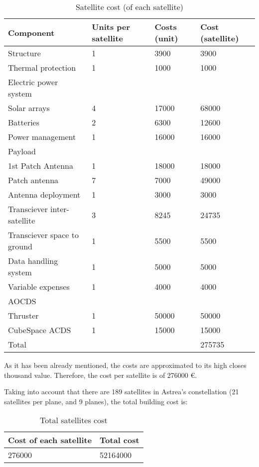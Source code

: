 \begin{table}[h]
\begin{center}
\begin{tabular}{ | l | l | l | l | }
\toprule
\hline
\rowcolor[gray]{0.75}
	Component & Units per satellite & Costs (unit) & Cost (satellite) \\ \hline
	Structure & 1 & 3900 & 3900 \\ \hline
	Thermal protection & 1 & 1000 & 1000 \\ \hline
	\rowcolor[gray]{0.85}
	Electric power system &  & \  & \  \\ \hline
	Solar arrays & 4 & 17000 & 68000 \\ \hline
	Batteries & 2 & 6300 & 12600 \\ \hline
	Power management & 1 & 16000 & 16000 \\ \hline
	\rowcolor[gray]{0.85}
	Payload &  & \  & \  \\ \hline
	1st Patch Antenna & 1 & 18000 & 18000 \\ \hline
	Patch antenna & 7 & 7000 & 49000 \\ \hline
	Antenna deployment & 1 & 3000 & 3000 \\ \hline
	Transciever inter-satellite & 3 & 8245 & 24735 \\ \hline
	Transciever space to ground & 1 & 5500 & 5500 \\ \hline
	Data handling system & 1 & 5000 & 5000 \\ \hline
	Variable expenses & 1 & 4000 & 4000 \\ \hline
	\rowcolor[gray]{0.85}
	AOCDS &  & \  & \  \\ \hline
	Thruster & 1 & 50000 & 50000 \\ \hline
	CubeSpace ACDS & 1 & 15000 & 15000 \\ \hline
	\rowcolor[gray]{0.65}
	Total &  & \  & 275735\  \\ \hline
	\bottomrule
\end{tabular}
\caption{Satellite cost (of each satellite)}
\end{center}
\end{table}

As it has been already mentioned, the costs are approximated to its high closes thousand value. Therefore, the cost per satellite is of 276000 \euro. 

Taking into account that there are 189 satellites in Astrea's constellation (21 satellites per plane, and 9 planes), the total building cost is:

\begin{table}[h]
\begin{center}
\begin{tabular}{ | l | l | }
\toprule
\hline
	\rowcolor[gray]{0.75}
	Cost of each satellite & Total cost \\ \hline
	276000 & 52164000 \\ \hline
	\bottomrule
\end{tabular}
\caption{Total satellites cost}
\end{center}
\end{table}


